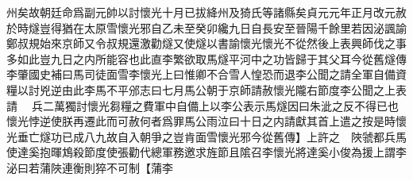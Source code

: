 州矣故朝廷命爲副元帥以討懷光十月已拔絳州及猗氏等諸縣矣貞元元年正月改元赦於時燧豈得猶在太原雪懷光邪自乙未至癸卯纔九日自長安至晉陽千餘里若因泌諷諭鄭叔規始來京師又令叔規還激勸燧又使燧以書諭懷光懷光不從然後上表興師伐之事多如此豈九日之内所能容也此直李繁欲取馬燧平河中之功皆歸于其父耳今從舊燧傳李肇國史補曰馬司徒面雪李懷光上曰惟卿不合雪人惶恐而退李公聞之請全軍自備資糧以討兇逆由此李馬不平邠志曰七月馬公朝于京師請赦懷光隴右節度李公聞之上表請　兵二萬獨討懷光芻糧之費軍中自備上以李公表示馬燧因曰朱泚之反不得已也懷光悖逆使朕再遷此而可赦何者爲罪馬公雨泣曰十日之内請獻其首上遣之按是時懷光垂亡燧功已成八九故自入朝爭之豈肯面雪懷光邪今從舊傳】上許之　陜虢都兵馬使達奚抱暉鴆殺節度使張勸代總軍務邀求旌節且隂召李懷光將達奚小俊為援上謂李泌曰若蒲陜連衡則猝不可制【蒲李
